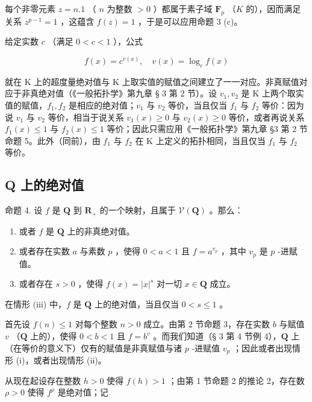 每个非零元素 \(z = n.1\) （ \(n\) 为整数 \(>0\) ）都属于素子域 \(\mathbf{F}_p\) （\(K\) 的），因而满足关系 \(z^{p-1} = 1\) ，这蕴含 \(f(z) = 1\) ，于是可以应用命题 3 (c)。

给定实数 \(c\) （满足 \(0 < c < 1\) ），公式

\[
f (x) = c ^ {v (x)}, \quad v (x) = \log_ {c} f (x)
\]

就在 K 上的超度量绝对值与 K 上取实值的赋值之间建立了一一对应。非真赋值对应于非真绝对值（《一般拓扑学》第九章 § 3 第 2 节）。设 \(v_{1}, v_{2}\) 是 K 上两个取实值的赋值，\(f_{1}, f_{2}\) 是相应的绝对值；\(v_{1}\) 与 \(v_{2}\) 等价，当且仅当 \(f_{1}\) 与 \(f_{2}\) 等价：因为说 \(v_{1}\) 与 \(v_{2}\) 等价，相当于说关系 \(v_{1}(x) \geqslant 0\) 与 \(v_{2}(x) \geqslant 0\) 等价，或者再说关系 \(f_{1}(x) \leqslant 1\) 与 \(f_{2}(x) \leqslant 1\) 等价；因此只需应用《一般拓扑学》第九章 §3 第 2 节命题 5。此外（同前），由 \(f_{1}\) 与 \(f_{2}\) 在 K 上定义的拓扑相同，当且仅当 \(f_{1}\) 与 \(f_{2}\) 等价。

\subsection{Q 上的绝对值}

命题 4. 设 \(f\) 是 \(\mathbf{Q}\) 到 \(\mathbf{R}_+\) 的一个映射，且属于 \(\mathcal{V}(\mathbf{Q})\) 。那么：

\begin{enumerate}
\def\labelenumi{(\roman{enumi})}
\item
  或者 \(f\) 是 \(\mathbf{Q}\) 上的非真绝对值。
\item
  或者存在实数 \(a\) 与素数 \(p\) ，使得 \(0 < a < 1\) 且 \(f = a^{v_p}\) ，其中 \(v_p\) 是 \(p\) -进赋值。
\item
  或者存在 \(s > 0\) ，使得 \(f(x) = |x|^s\) 对一切 \(x \in \mathbf{Q}\) 成立。
\end{enumerate}

在情形 (iii) 中，\(f\) 是 \(\mathbf{Q}\) 上的绝对值，当且仅当 \(0 < s \leqslant 1\) 。

首先设 \(f(n) \leqslant 1\) 对每个整数 \(n > 0\) 成立。由第 2 节命题 3，存在实数 \(b\) 与赋值 \(v\) （\(\mathbf{Q}\) 上的），使得 \(0 < b < 1\) 且 \(f = b^v\) 。而我们知道（§ 3 第 4 节例 4），\(\mathbf{Q}\) 上（在等价的意义下）仅有的赋值是非真赋值与诸 \(p\) -进赋值 \(v_p\) ；因此或者出现情形 (i)，或者出现情形 (ii)。

从现在起设存在整数 \(h > 0\) 使得 \(f(h) > 1\) ；由第 1 节命题 2 的推论 2，存在数 \(\rho > 0\) 使得 \(f^{\rho}\) 是绝对值；记

